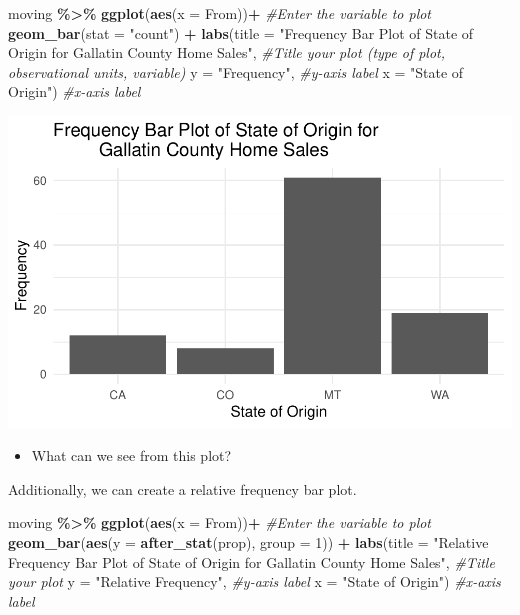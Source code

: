 \documentclass[
]{report}
\newenvironment{Shaded}{\begin{snugshade}}{\end{snugshade}}
\newcommand{\AttributeTok}[1]{\textcolor[rgb]{0.13,0.29,0.53}{#1}}
\newcommand{\CommentTok}[1]{\textcolor[rgb]{0.56,0.35,0.01}{\textit{#1}}}
\newcommand{\DecValTok}[1]{\textcolor[rgb]{0.00,0.00,0.81}{#1}}
\newcommand{\FunctionTok}[1]{\textcolor[rgb]{0.13,0.29,0.53}{\textbf{#1}}}
\newcommand{\NormalTok}[1]{#1}
\newcommand{\SpecialCharTok}[1]{\textcolor[rgb]{0.81,0.36,0.00}{\textbf{#1}}}
\newcommand{\StringTok}[1]{\textcolor[rgb]{0.31,0.60,0.02}{#1}}
\providecommand{\tightlist}{%
  \setlength{\itemsep}{0pt}\setlength{\parskip}{0pt}}
\begin{document}
\begin{Shaded}
\begin{Highlighting}[]
\NormalTok{moving }\SpecialCharTok{\%\textgreater{}\%}
    \FunctionTok{ggplot}\NormalTok{(}\FunctionTok{aes}\NormalTok{(}\AttributeTok{x =}\NormalTok{ From))}\SpecialCharTok{+} \CommentTok{\#Enter the variable to plot}
    \FunctionTok{geom\_bar}\NormalTok{(}\AttributeTok{stat =} \StringTok{"count"}\NormalTok{) }\SpecialCharTok{+} 
    \FunctionTok{labs}\NormalTok{(}\AttributeTok{title =} \StringTok{"Frequency Bar Plot of State of Origin for}
\StringTok{         Gallatin County Home Sales"}\NormalTok{, }
         \CommentTok{\#Title your plot (type of plot, observational units, variable)}
       \AttributeTok{y =} \StringTok{"Frequency"}\NormalTok{, }\CommentTok{\#y{-}axis label}
       \AttributeTok{x =} \StringTok{"State of Origin"}\NormalTok{) }\CommentTok{\#x{-}axis label}
\end{Highlighting}
\end{Shaded}

\begin{center}\includegraphics[width=0.65\linewidth]{03-VN03-EDA_OneCatSimulation_files/figure-latex/unnamed-chunk-5-1} \end{center}

\begin{itemize}
\tightlist
\item
  What can we see from this plot?
\end{itemize}

\vspace{0.3in}

Additionally, we can create a relative frequency bar plot.

\begin{Shaded}
\begin{Highlighting}[]
\NormalTok{moving }\SpecialCharTok{\%\textgreater{}\%}
  \FunctionTok{ggplot}\NormalTok{(}\FunctionTok{aes}\NormalTok{(}\AttributeTok{x =}\NormalTok{ From))}\SpecialCharTok{+} \CommentTok{\#Enter the variable to plot}
  \FunctionTok{geom\_bar}\NormalTok{(}\FunctionTok{aes}\NormalTok{(}\AttributeTok{y =} \FunctionTok{after\_stat}\NormalTok{(prop), }\AttributeTok{group =} \DecValTok{1}\NormalTok{)) }\SpecialCharTok{+}
  \FunctionTok{labs}\NormalTok{(}\AttributeTok{title =} \StringTok{"Relative Frequency Bar Plot of State of Origin }
\StringTok{       for Gallatin County Home Sales"}\NormalTok{, }
       \CommentTok{\#Title your plot}
       \AttributeTok{y =} \StringTok{"Relative Frequency"}\NormalTok{, }\CommentTok{\#y{-}axis label}
       \AttributeTok{x =} \StringTok{"State of Origin"}\NormalTok{) }\CommentTok{\#x{-}axis label}
\end{Highlighting}
\end{Shaded}
\end{document}
